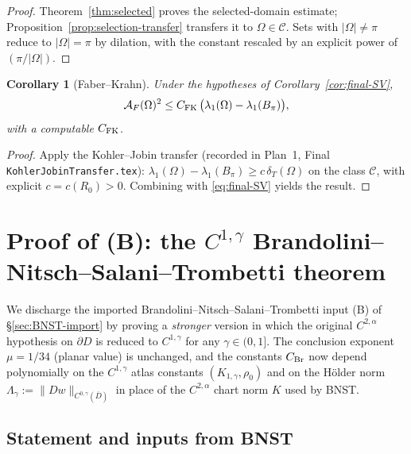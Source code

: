 \documentclass[11pt]{amsart}
\newtheorem{corollary}[theorem]{Corollary}
\newcommand{\dT}{\delta_T}
\newcommand{\AF}{\mathcal A_F}
\begin{document}
\begin{proof}
Theorem~\ref{thm:selected} proves the selected-domain estimate;
Proposition~\ref{prop:selection-transfer} transfers it to
\(\Omega\in\mathcal C\).  Sets with \(|\Omega|\ne\pi\) reduce to
\(|\Omega|=\pi\) by dilation, with the constant rescaled by an
explicit power of \((\pi/|\Omega|)\).
\end{proof}

\begin{corollary}[Faber--Krahn]\label{cor:FK}
Under the hypotheses of Corollary~\ref{cor:final-SV},
\[
   \AF(\Omega)^2\le C_{\rm FK}\,\bigl(\lambda_1(\Omega)
      -\lambda_1(B_\pi)\bigr),
\]
with a computable \(C_{\rm FK}\).
\end{corollary}

\begin{proof}
Apply the Kohler--Jobin transfer (recorded in Plan~1, Final
\texttt{KohlerJobinTransfer.tex}): \(\lambda_1(\Omega)-\lambda_1(B_\pi)
\ge c\,\dT(\Omega)\) on the class \(\mathcal C\), with explicit
\(c=c(R_0)>0\).  Combining with \eqref{eq:final-SV} yields the
result.
\end{proof}


\appendix

\section{Proof of (B): the \texorpdfstring{$C^{1,\gamma}$}{C(1,gamma)}
Brandolini--Nitsch--Salani--Trombetti theorem}\label{sec:BNST-proof}

We discharge the imported Brandolini--Nitsch--Salani--Trombetti
input (B) of \S\ref{sec:BNST-import} by proving a \emph{stronger}
version in which the original $C^{2,\alpha}$ hypothesis on $\partial
D$ is reduced to $C^{1,\gamma}$ for any $\gamma\in(0,1]$.  The
conclusion exponent $\mu=1/34$ (planar value) is unchanged, and the
constants $C_{\rm Br}$ now depend polynomially on the $C^{1,\gamma}$
atlas constants $(K_{1,\gamma},\rho_0)$ and on the Hölder norm
$\Lambda_\gamma:=\|Dw\|_{C^{0,\gamma}(\overline D)}$ in place of the
$C^{2,\alpha}$ chart norm $K$ used by BNST.

\subsection{Statement and inputs from BNST}\label{ss:BNST-Cgamma-stat}
\end{document}

